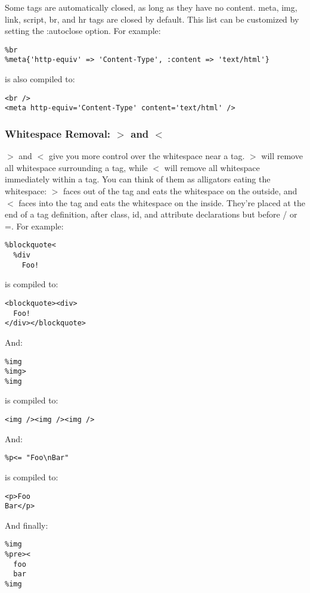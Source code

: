 \documentclass[10pt]{article}
\begin{document}
 Some tags are automatically closed, as long as they have no content. meta, img, link, script, br, and hr tags are closed by default. This list can be customized by setting the :autoclose option. For example:
\begin{verbatim}
%br
%meta{'http-equiv' => 'Content-Type', :content => 'text/html'}
\end{verbatim}


 is also compiled to:
\begin{verbatim}
<br />
<meta http-equiv='Content-Type' content='text/html' />
\end{verbatim}
\subsubsection*{Whitespace Removal: $>$ and $<$}


 $>$ and $<$ give you more control over the whitespace near a tag. $>$ will remove all whitespace surrounding a tag, while $<$ will remove all whitespace immediately within a tag. You can think of them as alligators eating the whitespace: $>$ faces out of the tag and eats the whitespace on the outside, and $<$ faces into the tag and eats the whitespace on the inside. They’re placed at the end of a tag definition, after class, id, and attribute declarations but before / or =. For example:
\begin{verbatim}
%blockquote<
  %div
    Foo!
\end{verbatim}


 is compiled to:
\begin{verbatim}
<blockquote><div>
  Foo!
</div></blockquote>
\end{verbatim}


 And:
\begin{verbatim}
%img
%img>
%img
\end{verbatim}


 is compiled to:
\begin{verbatim}
<img /><img /><img />
\end{verbatim}


 And:
\begin{verbatim}
%p<= "Foo\nBar"
\end{verbatim}


 is compiled to:
\begin{verbatim}
<p>Foo
Bar</p>
\end{verbatim}


 And finally:
\begin{verbatim}
%img
%pre><
  foo
  bar
%img
\end{verbatim}
\end{document}
